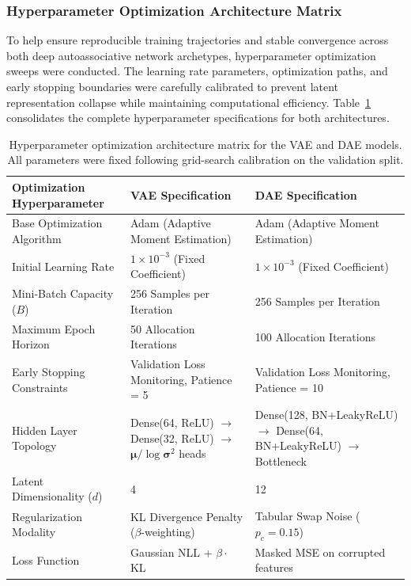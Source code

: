 \subsubsection{Hyperparameter Optimization Architecture Matrix}

To help ensure reproducible training trajectories and stable convergence across both deep autoassociative network archetypes, hyperparameter optimization sweeps were conducted. The learning rate parameters, optimization paths, and early stopping boundaries were carefully calibrated to prevent latent representation collapse while maintaining computational efficiency. Table~\ref{tab:7.1} consolidates the complete hyperparameter specifications for both architectures.

\begin{table}[htbp]
\centering
\caption{Hyperparameter optimization architecture matrix for the VAE and DAE models. All parameters were fixed following grid-search calibration on the validation split.}
\label{tab:7.1}
\small
\begin{tabularx}{\textwidth}{@{\extracolsep{\fill}} l X X}
\toprule
\textbf{Optimization Hyperparameter} & \textbf{VAE Specification} & \textbf{DAE Specification} \\
\midrule
Base Optimization Algorithm & Adam (Adaptive Moment Estimation) & Adam (Adaptive Moment Estimation) \\
Initial Learning Rate & $1 \times 10^{-3}$ (Fixed Coefficient) & $1 \times 10^{-3}$ (Fixed Coefficient) \\
Mini-Batch Capacity ($B$) & 256 Samples per Iteration & 256 Samples per Iteration \\
Maximum Epoch Horizon & 50 Allocation Iterations & 100 Allocation Iterations \\
Early Stopping Constraints & Validation Loss Monitoring, Patience = 5 & Validation Loss Monitoring, Patience = 10 \\
Hidden Layer Topology & Dense(64, ReLU) $\rightarrow$ Dense(32, ReLU) $\rightarrow$ $\boldsymbol{\mu}/\log\boldsymbol{\sigma}^2$ heads & Dense(128, BN+LeakyReLU) $\rightarrow$ Dense(64, BN+LeakyReLU) $\rightarrow$ Bottleneck \\
Latent Dimensionality ($d$) & 4 & 12 \\
Regularization Modality & KL Divergence Penalty ($\beta$-weighting) & Tabular Swap Noise ($p_c = 0.15$) \\
Loss Function & Gaussian NLL + $\beta \cdot$ KL & Masked MSE on corrupted features \\
\bottomrule
\end{tabularx}
\end{table}


